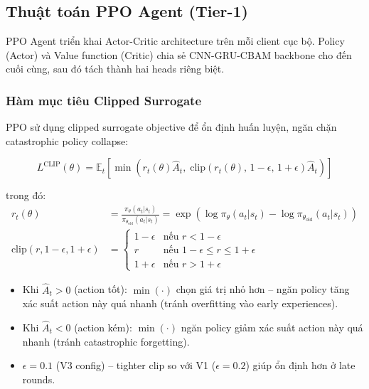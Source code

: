 \documentclass[12pt,a4paper]{article}
\begin{document}
\subsection{Thuật toán PPO Agent (Tier-1)}\label{sec:ppo_agent}

PPO Agent triển khai Actor-Critic architecture trên mỗi client cục bộ. Policy (Actor) và Value function (Critic) chia sẻ CNN-GRU-CBAM backbone cho đến cuối cùng, sau đó tách thành hai heads riêng biệt.

\subsubsection{Hàm mục tiêu Clipped Surrogate}

PPO sử dụng clipped surrogate objective để ổn định huấn luyện, ngăn chặn catastrophic policy collapse:

\begin{equation}\label{eq:ppo_clip}
    L^{\text{CLIP}}(\theta) = \mathbb{E}_t\left[\min\left(r_t(\theta)\hat{A}_t,\;\text{clip}(r_t(\theta),\,1-\epsilon,\,1+\epsilon)\hat{A}_t\right)\right]
\end{equation}

trong đó:
\begin{align}
    r_t(\theta) &= \frac{\pi_\theta(a_t|s_t)}{\pi_{\theta_{\text{old}}}(a_t|s_t)}
                = \exp\left(\log\pi_\theta(a_t|s_t) - \log\pi_{\theta_{\text{old}}}(a_t|s_t)\right) \label{eq:ratio} \\
    \text{clip}(r, 1-\epsilon, 1+\epsilon) &= \begin{cases}
        1-\epsilon & \text{nếu } r < 1-\epsilon \\
        r          & \text{nếu } 1-\epsilon \leq r \leq 1+\epsilon \\
        1+\epsilon & \text{nếu } r > 1+\epsilon
    \end{cases} \label{eq:clip_fn}
\end{align}

\begin{itemize}
    \item Khi $\hat{A}_t > 0$ (action tốt): $\min(\cdot)$ chọn giá trị nhỏ hơn -- ngăn policy tăng xác suất action này quá nhanh (tránh overfitting vào early experiences).
    \item Khi $\hat{A}_t < 0$ (action kém): $\min(\cdot)$ ngăn policy giảm xác suất action này quá nhanh (tránh catastrophic forgetting).
    \item $\epsilon = 0.1$ (V3 config) -- tighter clip so với V1 ($\epsilon=0.2$) giúp ổn định hơn ở late rounds.
\end{itemize}
\end{document}
